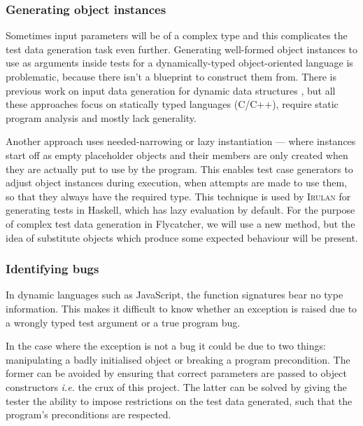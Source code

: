 \subsubsection{Generating object instances}
Sometimes input parameters will be of a complex type and this complicates the test data generation task even further. Generating well-formed object instances to use as arguments inside tests for a dynamically-typed object-oriented language is problematic, because there isn't a blueprint to construct them from. There is previous work on input data generation for dynamic data structures \cite{korel1990automated, visvanathan2002generating, sai2005address, zhao2007automatic}, but all these approaches focus on statically typed languages (C/C++), require static program analysis and mostly lack generality.

Another approach uses needed-narrowing \cite{antoy1994needed} or lazy instantiation \cite{lindblad2007property} --- where instances start off as empty placeholder objects and their members are only created when they are actually put to use by the program. This enables test case generators to adjust object instances during execution, when attempts are made to use them, so that they always have the required type. This technique is used by \textsc{Irulan} \cite{allwood2011high} for generating tests in Haskell, which has lazy evaluation by default. For the purpose of complex test data generation in \textsf{Flycatcher}, we will use a new method, but the idea of substitute objects which produce some expected behaviour will be present.

\subsubsection{Identifying bugs}

In dynamic languages such as JavaScript, the function signatures bear no type information. This makes it difficult to know whether an exception is raised due to a wrongly typed test argument or a true program bug.

In the case where the exception is not a bug it could be due to two things: manipulating a badly initialised object or breaking a program precondition. The former can be avoided by ensuring that correct parameters are passed to object constructors \emph{i.e.} the crux of this project. The latter can be solved by giving the tester the ability to impose restrictions on the test data generated, such that the program's preconditions are respected.

